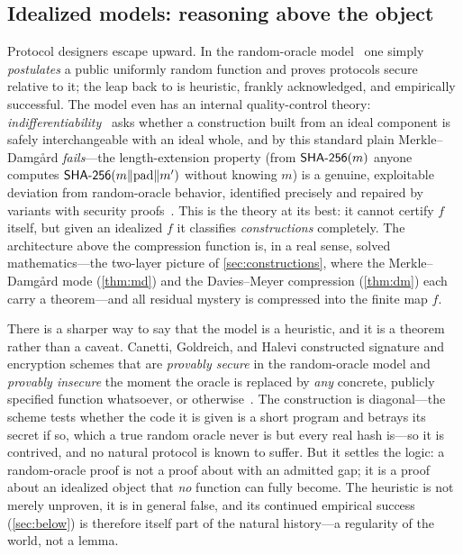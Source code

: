 \subsection{Idealized models: reasoning above the object}
\label{sec:models}

Protocol designers escape upward. In the random-oracle
model~\citep{BellareRogaway1993} one simply \emph{postulates} a public
uniformly random function and proves protocols secure relative to it; the
leap back to \SHA{} is heuristic, frankly acknowledged, and empirically
successful. The model even has an internal quality-control theory:
\emph{indifferentiability}~\citep{MRH2004} asks whether a construction
built from an ideal component is safely interchangeable with an ideal
whole, and by this standard plain Merkle--Damg{\aa}rd \emph{fails}---the
length-extension property (from $\textsf{SHA-256}(m)$ anyone computes
$\textsf{SHA-256}(m \Vert \mathrm{pad} \Vert m')$ without knowing $m$) is a genuine,
exploitable deviation from random-oracle behavior, identified precisely
and repaired by variants with security proofs~\citep{CDMP2005}. This is
the theory at its best: it cannot certify $f$ itself, but given an
idealized $f$ it classifies \emph{constructions} completely. The
architecture above the compression function is, in a real sense, solved
mathematics---the two-layer picture of \cref{sec:constructions}, where
the Merkle--Damg{\aa}rd mode (\cref{thm:md}) and the Davies--Meyer
compression (\cref{thm:dm}) each carry a theorem---and all residual
mystery is compressed into the finite map $f$.

There is a sharper way to say that the model is a heuristic, and it is a
theorem rather than a caveat. Canetti, Goldreich, and Halevi
constructed signature and encryption schemes that are \emph{provably
secure} in the random-oracle model and \emph{provably insecure} the
moment the oracle is replaced by \emph{any} concrete, publicly specified
function whatsoever, \SHA{} or otherwise~\citep{CGH2004}. The
construction is diagonal---the scheme tests whether the code it is given
is a short program and betrays its secret if so, which a true random
oracle never is but every real hash is---so it is contrived, and no
natural protocol is known to suffer. But it settles the logic: a
random-oracle proof is not a proof about \SHA{} with an admitted gap; it
is a proof about an idealized object that \emph{no} function can fully
become. The heuristic is not merely unproven, it is in general false,
and its continued empirical success (\cref{sec:below}) is therefore
itself part of the natural history---a regularity of the world, not a
lemma.

